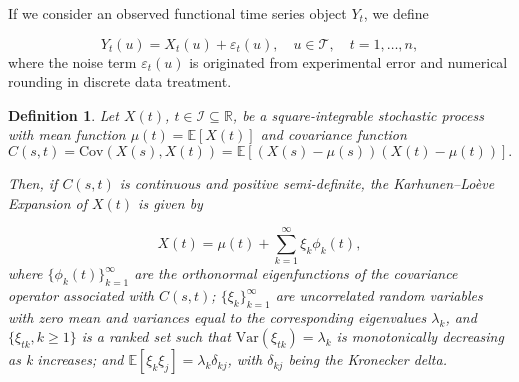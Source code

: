 \documentclass[
	12pt,				%
	oneside,			%
	a4paper,			%
	english,			%
	brazil				%
	]{abntex2ppgsi}
\newtheorem{definition}{Definition}
\begin{document}
If we consider an observed functional time series object $Y_t$, we define

\begin{equation}
     Y_t(u) = X_t(u) + \varepsilon_t(u), \quad u \in \mathcal{T}, \quad t = 1, \dots, n,
\label{eq:observed_ts}
\end{equation}
where the noise term $\varepsilon_t(u)$ is originated from experimental error and numerical rounding in discrete data treatment.

\begin{definition}
Let \( X(t) \), \( t \in \mathcal{I} \subseteq \mathbb{R} \), be a square-integrable stochastic process with mean function \( \mu(t) = \mathbb{E}[X(t)] \) and covariance function 
\begin{equation}
C(s, t) = \text{Cov}(X(s), X(t)) = \mathbb{E}[(X(s) - \mu(s))(X(t) - \mu(t))].
\end{equation}

Then, if \( C(s, t) \) is continuous and positive semi-definite, the Karhunen--Lo\`eve Expansion of \( X(t) \) is given by

\begin{equation}
X(t) = \mu(t) + \sum_{k=1}^\infty \xi_k \phi_k(t),
\label{eq:kl_decomp}
\end{equation}
where \( \{ \phi_k(t) \}_{k=1}^\infty \) are the orthonormal eigenfunctions of the covariance operator associated with \( C(s, t) \); \( \{ \xi_k \}_{k=1}^\infty \) are uncorrelated random variables with zero mean and variances equal to the corresponding eigenvalues \( \lambda_k \), and $\{\xi_{tk},k\geq1\}$ is a ranked set such that $\text{Var}(\xi_{tk})=\lambda_k$ is monotonically decreasing as k increases; and \( \mathbb{E}[\xi_k \xi_j] = \lambda_k \delta_{kj} \), with \( \delta_{kj} \) being the Kronecker delta.
\end{definition}
\end{document}
